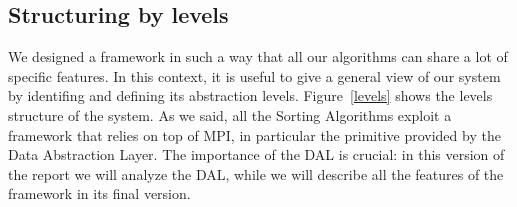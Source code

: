 \subsection{Structuring by levels}
We designed a framework in such a way that all our algorithms can share a lot of specific features. In this context, it is useful to give a general view of our system by identifing and defining its abstraction levels. Figure~\ref{levels} shows the levels structure of the system. As we said, all the Sorting Algorithms exploit a framework that relies on top of MPI, in particular the primitive provided by the Data Abstraction Layer. The importance of the DAL is crucial: in this version of the report we will analyze the DAL, while we will describe all the features of the framework in its final version.